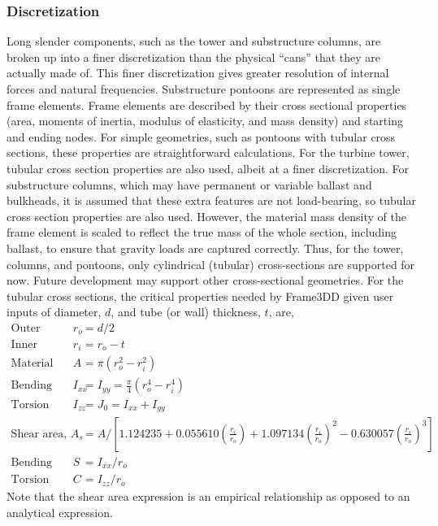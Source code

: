 \subsubsection{Discretization}
Long slender components, such as the tower and substructure columns, are
broken up into a finer discretization than the physical ``cans'' that
they are actually made of.  This finer discretization gives greater
resolution of internal forces and natural frequencies.  Substructure
pontoons are represented as single frame elements.  Frame elements are
described by their cross sectional properties (area, moments of inertia,
modulus of elasticity, and mass density) and starting and ending nodes.
For simple geometries, such as pontoons with tubular cross sections,
these properties are straightforward calculations.  For the turbine
tower, tubular cross section properties are also used, albeit at a finer
discretization.  For substructure columns, which may have permanent or
variable ballast and bulkheads, it is assumed that these extra features
are not load-bearing, so tubular cross section properties are also used.
However, the material mass density of the frame element is scaled to
reflect the true mass of the whole section, including ballast, to ensure
that gravity loads are captured correctly.  Thus, for the tower,
columns, and pontoons, only cylindrical (tubular) cross-sections are
supported for now.  Future development may support other cross-sectional
geometries.  For the tubular cross sections, the critical properties
needed by Frame3DD given user inputs of diameter, $d$, and tube (or
wall) thickness, $t$, are,
\begin{align*}
  \textrm{Outer radius, } r_o &= d/2\\
  \textrm{Inner radius, } r_i &= r_o - t\\
  \textrm{Material area, } A &= \pi \left( r_o^2 - r_i^2 \right)\\
  \textrm{Bending second moment of area, } I_{xx} &= I_{yy} = \frac{\pi}{4}\left( r_o^4 - r_i^4 \right)\\
  \textrm{Torsion second moment of area, } I_{zz} &= J_0 = I_{xx} + I_{yy}\\
  \textrm{Shear area, } A_{s} &= A / \left[ 1.124235 + 0.055610\left(\frac{r_i}{r_o}\right) +
           1.097134\left(\frac{r_i}{r_o}\right)^2 - 0.630057\left(\frac{r_i}{r_o}\right)^3 \right]\\
  \textrm{Bending modulus, } S &= I_{xx} / r_o \\
  \textrm{Torsion modulus (shear constant), } C &= I_{zz} / r_o
\end{align*}
Note that the shear area expression is an empirical relationship as
opposed to an analytical expression.

